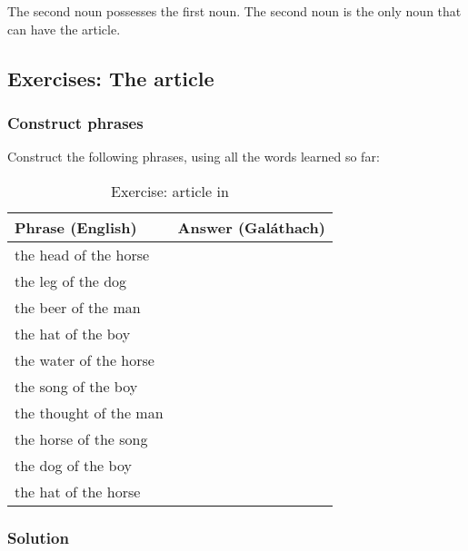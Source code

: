 The second noun possesses the first noun. The second noun is the only noun that can have the article.

\newpage
\subsection{Exercises: The article}

\subsubsection{Construct phrases}

Construct the following phrases, using all the words learned so far:
\begin{table}[H]
\centering
\begin{tabular}{|l|M{10.0cm}|}
  \toprule
  \textbf{Phrase (English)} & \textbf{Answer (Gal\'{a}thach)}\\
  \toprule
  the head of the horse & \\
  \midrule
  the leg of the dog & \\
  \midrule
  the beer of the man & \\
  \midrule
  the hat of the boy & \\
  \midrule
  the water of the horse & \\
  \midrule
  the song of the boy & \\
  \midrule
  the thought of the man & \\
  \midrule
  the horse of the song & \\
  \midrule
  the dog of the boy & \\
  \midrule
  the hat of the horse & \\
  \bottomrule
\end{tabular}
\label{exercise_article_in}
\caption{Exercise: article in}
\end{table}

\newpage
\subsubsection{Solution}

